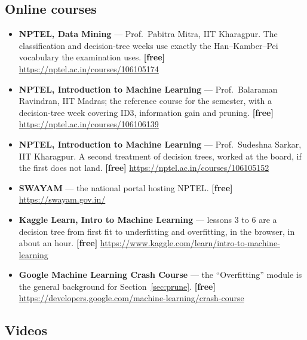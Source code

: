 \documentclass[11pt]{article}
\begin{document}
\subsection*{Online courses}

\begin{sloppypar}
\begin{itemize}[leftmargin=*]
  \item \textbf{NPTEL, Data Mining} --- Prof.\ Pabitra Mitra, IIT Kharagpur.
    The classification and decision-tree weeks use exactly the Han--Kamber--Pei
    vocabulary the examination uses. \textbf{[free]}
    \url{https://nptel.ac.in/courses/106105174}
  \item \textbf{NPTEL, Introduction to Machine Learning} --- Prof.\ Balaraman
    Ravindran, IIT Madras; the reference course for the semester, with a
    decision-tree week covering ID3, information gain and pruning.
    \textbf{[free]} \url{https://nptel.ac.in/courses/106106139}
  \item \textbf{NPTEL, Introduction to Machine Learning} --- Prof.\ Sudeshna
    Sarkar, IIT Kharagpur. A second treatment of decision trees, worked at the
    board, if the first does not land. \textbf{[free]}
    \url{https://nptel.ac.in/courses/106105152}
  \item \textbf{SWAYAM} --- the national portal hosting NPTEL. \textbf{[free]}
    \url{https://swayam.gov.in/}
  \item \textbf{Kaggle Learn, Intro to Machine Learning} --- lessons 3 to 6
    are a decision tree from first fit to underfitting and overfitting, in the
    browser, in about an hour. \textbf{[free]}
    \url{https://www.kaggle.com/learn/intro-to-machine-learning}
  \item \textbf{Google Machine Learning Crash Course} --- the ``Overfitting''
    module is the general background for Section~\ref{sec:prune}.
    \textbf{[free]}
    \url{https://developers.google.com/machine-learning/crash-course}
\end{itemize}
\end{sloppypar}

\subsection*{Videos}
\end{document}
